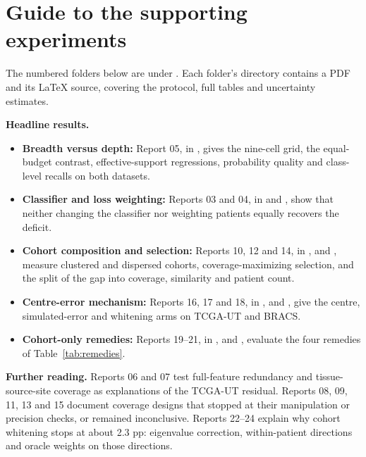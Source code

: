 \documentclass[11pt]{article}
\begin{document}
\appendix
\raggedright
\section{Guide to the supporting experiments}
The numbered folders below are under . Each folder's  directory contains a PDF and its LaTeX source, covering the protocol, full tables and uncertainty estimates.

\noindent\textbf{Headline results.}
\begin{itemize}\setlength{\itemsep}{2pt}
\item \textbf{Breadth versus depth:} Report 05, in , gives the nine-cell grid, the equal-budget contrast, effective-support regressions, probability quality and class-level recalls on both datasets.
\item \textbf{Classifier and loss weighting:} Reports 03 and 04, in  and , show that neither changing the classifier nor weighting patients equally recovers the deficit.
\item \textbf{Cohort composition and selection:} Reports 10, 12 and 14, in ,  and , measure clustered and dispersed cohorts, coverage-maximizing selection, and the split of the gap into coverage, similarity and patient count.
\item \textbf{Centre-error mechanism:} Reports 16, 17 and 18, in ,  and , give the centre, simulated-error and whitening arms on TCGA-UT and BRACS.
\item \textbf{Cohort-only remedies:} Reports 19--21, in ,  and , evaluate the four remedies of Table~\ref{tab:remedies}.
\end{itemize}

\noindent\textbf{Further reading.} Reports 06 and 07 test full-feature redundancy and tissue-source-site coverage as explanations of the TCGA-UT residual. Reports 08, 09, 11, 13 and 15 document coverage designs that stopped at their manipulation or precision checks, or remained inconclusive. Reports 22--24 explain why cohort whitening stops at about 2.3 pp: eigenvalue correction, within-patient directions and oracle weights on those directions.

\clearpage


\end{document}
